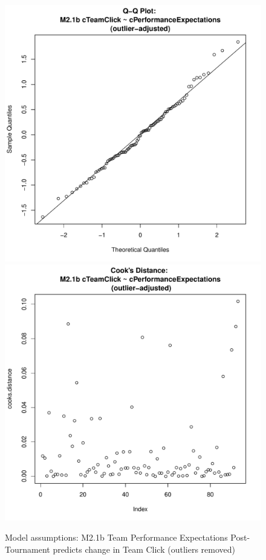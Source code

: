 \begin{figure}[htbp]
   \includegraphics[scale =.4]{images/MLM21bOutQQNorm.pdf}
   \includegraphics[scale =.4]{images/MLM21bOutCooksD.pdf}
   \caption{Model assumptions: M2.1b Team Performance Expectations Post-Tournament predicts change in Team Click (outliers removed)}
   \label{fig:MLM21bOutAssumptions}
 \end{figure}





